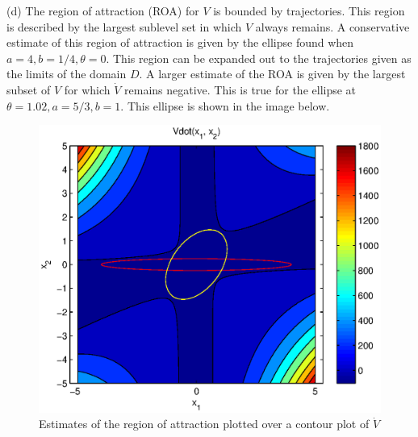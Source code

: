 \documentclass[paper=a4, fontsize=11pt]{scrartcl} %
\numberwithin{equation}{section} %
\numberwithin{figure}{section} %
\numberwithin{table}{section} %
\begin{document}
(d) The region of attraction (ROA) for $V$ is bounded by trajectories. This region is described by the largest sublevel set in which ${V}$ always remains. A conservative estimate of this region of attraction is given by the ellipse found when $a=4, b=1/4, \theta=0$. This region can be expanded out to the trajectories given as the limits of the domain $D$. A larger estimate of the ROA is given by the largest subset of $V$ for which $\dot{V}$ remains negative. This is true for the ellipse at $\theta=1.02, a = 5/3, b= 1$. This ellipse is shown in the image below.

\begin{figure}[h]
\label{contour2}
\centering
\includegraphics[scale=0.75]{prob3_ROA}
\caption{Estimates of the region of attraction plotted over a contour plot of $\dot{V}$}
\end{figure} 

\newpage
\end{document}
